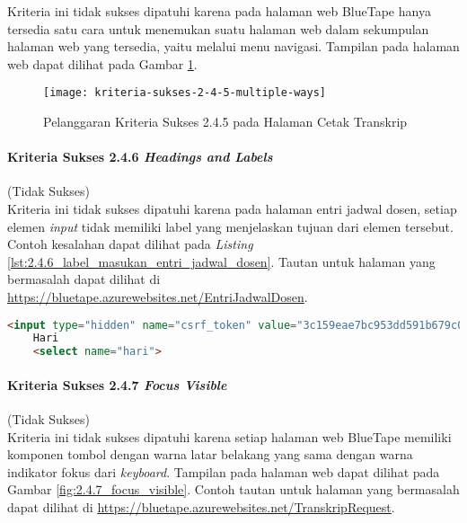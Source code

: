 Kriteria ini tidak sukses dipatuhi karena pada halaman web BlueTape hanya tersedia satu cara untuk menemukan suatu halaman web dalam sekumpulan halaman web yang tersedia, yaitu melalui menu navigasi. Tampilan pada halaman web dapat dilihat pada Gambar \ref{fig:2.4.5_multiple_ways}.

\begin{figure}[H]
    \centering  
    \texttt{[image: kriteria-sukses-2-4-5-multiple-ways]}  
    \caption[Pelanggaran Kriteria Sukses 2.4.5 pada Halaman Cetak Transkrip]{Pelanggaran Kriteria Sukses 2.4.5 pada Halaman Cetak Transkrip}
    \label{fig:2.4.5_multiple_ways}  
\end{figure}

\paragraph{Kriteria Sukses 2.4.6 \textit{Headings and Labels}}
\label{par:kepatuhan_bluetape_kriteria_sukses_2.4.6}
(Tidak Sukses)\\

Kriteria ini tidak sukses dipatuhi karena pada halaman entri jadwal dosen, setiap elemen \textit{input} tidak memiliki label yang menjelaskan tujuan dari elemen tersebut. Contoh kesalahan dapat dilihat pada \textit{Listing} \ref{lst:2.4.6_label_masukan_entri_jadwal_dosen}. Tautan untuk halaman yang bermasalah dapat dilihat di \url{https://bluetape.azurewebsites.net/EntriJadwalDosen}.

\begin{lstlisting}[frame=single, label={lst:2.4.6_label_masukan_entri_jadwal_dosen}, language=HTML, caption=Pelanggaran Kriteria Sukses 2.4.6 pada Halaman Entri Jadwal Dosen]
    <input type="hidden" name="csrf_token" value="3c159eae7bc953dd591b679c080ed066"/>
    Hari
    <select name="hari">
\end{lstlisting}

\paragraph{Kriteria Sukses 2.4.7 \textit{Focus Visible}}
\label{par:kepatuhan_bluetape_kriteria_sukses_2.4.7}
(Tidak Sukses)\\

Kriteria ini tidak sukses dipatuhi karena setiap halaman web BlueTape memiliki komponen tombol dengan warna latar belakang yang sama dengan warna indikator fokus dari \textit{keyboard}. Tampilan pada halaman web dapat dilihat pada Gambar \ref{fig:2.4.7_focus_visible}. Contoh tautan untuk halaman yang bermasalah dapat dilihat di \url{https://bluetape.azurewebsites.net/TranskripRequest}. 

